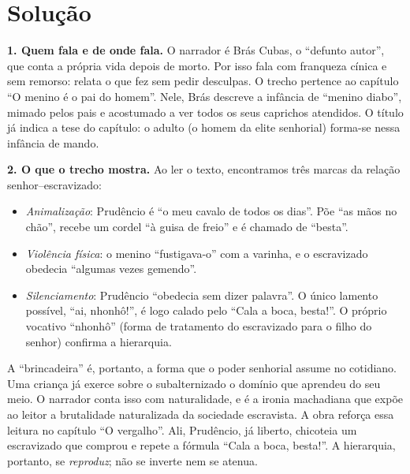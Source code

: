 \documentclass{article}%
\begin{document}
\section*{Solução}

\textbf{1. Quem fala e de onde fala.} O narrador é Brás Cubas, o ``defunto autor'', que conta a própria vida depois de morto. Por isso fala com franqueza cínica e sem remorso: relata o que fez sem pedir desculpas. O trecho pertence ao capítulo ``O menino é o pai do homem''. Nele, Brás descreve a infância de ``menino diabo'', mimado pelos pais e acostumado a ver todos os seus caprichos atendidos. O título já indica a tese do capítulo: o adulto (o homem da elite senhorial) forma-se nessa infância de mando.

\textbf{2. O que o trecho mostra.} Ao ler o texto, encontramos três marcas da relação senhor--escravizado:
\begin{itemize}
\item \emph{Animalização}: Prudêncio é ``o meu cavalo de todos os dias''. Põe ``as mãos no chão'', recebe um cordel ``à guisa de freio'' e é chamado de ``besta''.
\item \emph{Violência física}: o menino ``fustigava-o'' com a varinha, e o escravizado obedecia ``algumas vezes gemendo''.
\item \emph{Silenciamento}: Prudêncio ``obedecia sem dizer palavra''. O único lamento possível, ``ai, nhonhô!'', é logo calado pelo ``Cala a boca, besta!''. O próprio vocativo ``nhonhô'' (forma de tratamento do escravizado para o filho do senhor) confirma a hierarquia.
\end{itemize}
A ``brincadeira'' é, portanto, a forma que o poder senhorial assume no cotidiano. Uma criança já exerce sobre o subalternizado o domínio que aprendeu do seu meio. O narrador conta isso com naturalidade, e é a ironia machadiana que expõe ao leitor a brutalidade naturalizada da sociedade escravista. A obra reforça essa leitura no capítulo ``O vergalho''. Ali, Prudêncio, já liberto, chicoteia um escravizado que comprou e repete a fórmula ``Cala a boca, besta!''. A hierarquia, portanto, se \emph{reproduz}; não se inverte nem se atenua.
\end{document}
